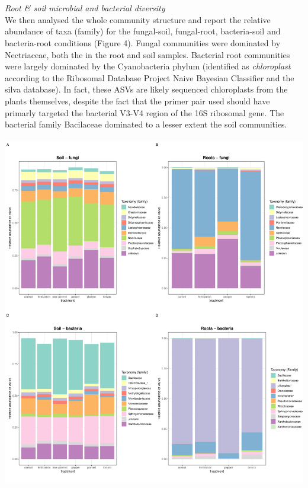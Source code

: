 \documentclass[11pt,]{article}
\begin{document}
~\\
\hspace*{0.333em}\\
\emph{Root \& soil microbial and bacterial diversity}\\
We then analysed the whole community structure and report the relative
abundance of taxa (family) for the fungal-soil, fungal-root,
bacteria-soil and bacteria-root conditions (Figure 4). Fungal
communities were dominated by Nectriaceae, both the in the root and soil
samples. Bacterial root communities were largely dominated by the
Cyanobacteria phylum (identified as \emph{chloroplast} according to the
Ribosomal Database Project Naive Bayesian Classifier and the silva
database). In fact, these ASVs are likely sequenced chloroplasts from
the plants themselves, despite the fact that the primer pair used should
have primarly targeted the bacterial V3-V4 region of the 16S ribosomal
gene. The bacterial family Bacilaceae dominated to a lesser extent the
soil communities.\\
\hspace*{0.333em}\\
\includegraphics[width=7.29167in]{../figures/Figure4_FAMILY_barplots.pdf}\\
\end{document}
